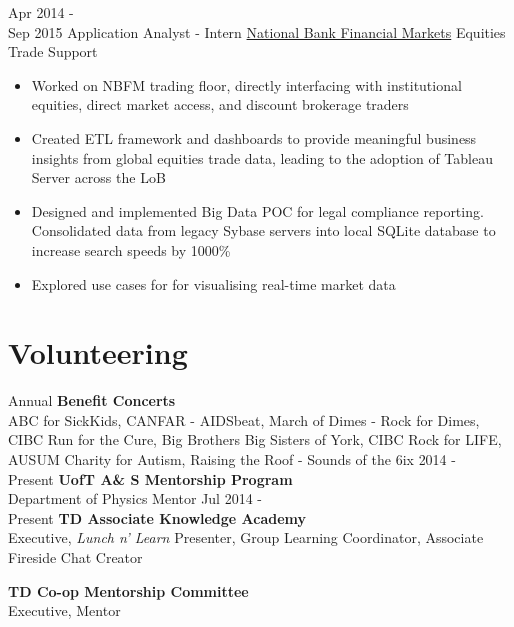 \documentclass[letterpaper]{twentysecondcv} %
\begin{document}
\begin{twenty}
     \twentyitem
   		{Apr 2014 - \\ Sep 2015}
        {Application Analyst - Intern}
        {\href{http://nbfm.ca/}{National Bank Financial Markets}}
        {Equities Trade Support}
        {
        \begin{itemize}
		\item Worked on NBFM trading floor, directly interfacing with institutional equities, direct market access, and discount brokerage traders
        \item Created ETL framework and  dashboards to provide meaningful business insights from global equities trade data, leading to the adoption of Tableau Server across the LoB
        \item Designed and implemented  Big Data POC for legal compliance reporting. Consolidated data from legacy Sybase servers into local SQLite database to increase search speeds by 1000\% 
        \item Explored use cases for  for visualising real-time market data
	    \end{itemize}
    	}
        
\end{twenty}

\vfill
\section{Volunteering}
\begin{twentyshort}
\twentyitemshort
		{Annual}
		{\textbf{Benefit Concerts} \\ ABC for SickKids, CANFAR - AIDSbeat, March of Dimes - Rock for Dimes, CIBC Run for the Cure, Big Brothers Big Sisters of York, CIBC Rock for LIFE, AUSUM Charity for Autism, Raising the Roof - Sounds of the 6ix}
\twentyitemshort
   		{2014 - \\ Present}
        {\textbf{UofT A\& S Mentorship Program} \\ Department of Physics Mentor}
\twentyitemshort
   		{Jul 2014 - \\ Present}
        {\textbf{TD Associate Knowledge Academy} \\ Executive, \emph{Lunch n' Learn} Presenter, Group Learning Coordinator, Associate Fireside Chat Creator}

\twentyitemshort
   		{}
        {\textbf{TD Co-op Mentorship Committee} \\ Executive, Mentor}
\end{twentyshort}
\end{document}
